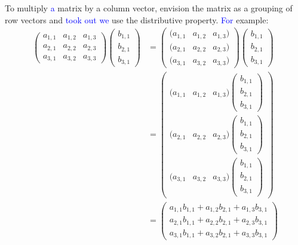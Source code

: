 \documentclass{ximera}
\begin{document}
To multiply \textcolor{blue}{a} matrix by a column vector, envision the matrix as a
grouping of row vectors and \textcolor{blue}{took out we} use the distributive property. \textcolor{blue}{For}
example:
\begin{align*}
\begin{pmatrix}
  a_{1,1} & a_{1,2} & a_{1,3} \\
  a_{2,1} & a_{2,2} & a_{2,3} \\
  a_{3,1} & a_{3,2} & a_{3,3}
\end{pmatrix}
\begin{pmatrix} b_{1,1} \\ b_{2,1} \\ b_{3,1} \end{pmatrix}
&=
\begin{pmatrix}
  (a_{1,1} & a_{1,2} & a_{1,3}) \\
  (a_{2,1} & a_{2,2} & a_{2,3}) \\
  (a_{3,1} & a_{3,2} & a_{3,3})
\end{pmatrix}
\begin{pmatrix} b_{1,1} \\ b_{2,1} \\ b_{3,1} \end{pmatrix}\\
&=
\begin{pmatrix}
  (a_{1,1} & a_{1,2} & a_{1,3}) \begin{pmatrix} b_{1,1} \\ b_{2,1} \\ b_{3,1} \end{pmatrix}\\
  (a_{2,1} & a_{2,2} & a_{2,3}) \begin{pmatrix} b_{1,1} \\ b_{2,1} \\ b_{3,1} \end{pmatrix}\\
  (a_{3,1} & a_{3,2} & a_{3,3}) \begin{pmatrix} b_{1,1} \\ b_{2,1} \\ b_{3,1} \end{pmatrix}
\end{pmatrix}\\
&=
\begin{pmatrix}
  a_{1,1}b_{1,1} + a_{1,2}b_{2,1} + a_{1,3}b_{3,1}  \\
  a_{2,1}b_{1,1} + a_{2,2}b_{2,1} + a_{2,3}b_{3,1}  \\
  a_{3,1}b_{1,1} + a_{3,2}b_{2,1} + a_{3,3}b_{3,1}
\end{pmatrix}
\end{align*}
\end{document}
